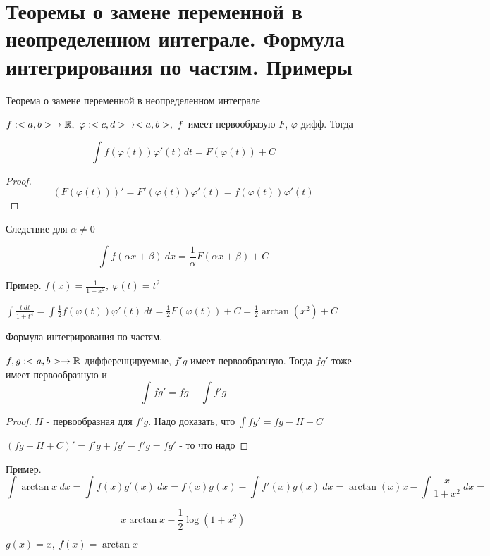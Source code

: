 \section{Теоремы о замене переменной в неопределенном интеграле. Формула интегрирования по частям. Примеры}

\begin{theorem}
    Теорема о замене переменной в неопределенном интеграле

    $f: <a, b> \to \mathbb{R},\ \varphi: <c, d> \to <a, b>,\ f$
    имеет первообразую $F$, $\varphi$ дифф. Тогда

    \[ \int f(\varphi(t))\varphi'(t) dt = F(\varphi(t))+C \]
\end{theorem}

\begin{proof}
    \[(F(\varphi(t)))' = F'(\varphi(t))\varphi'(t) = f(\varphi(t))\varphi'(t)\]
\end{proof}

Следствие для $\alpha \neq 0$

\[\int f(\alpha x + \beta)\ dx = \frac{1}{\alpha} F(\alpha x + \beta) + C \]

Пример. $f(x) = \frac{1}{1+x^2},\ \varphi(t) = t^2$

$\int \frac{t\ dt}{1+t^4} = \int \frac{1}{2}f(\varphi(t))\varphi'(t)\ dt
= \frac{1}{2} F(\varphi(t)) + C = \frac{1}{2} \arctan(x^2) + C$

\begin{theorem}
    Формула интегрирования по частям.

    $f, g: <a, b> \to \mathbb{R}$ дифференцируемые, $f'g$ имеет первообразную. Тогда
    $fg'$ тоже имеет первообразную и 
    \[ \int fg' = fg - \int f'g \]
\end{theorem}

\begin{proof}
    $H$ - первообразная для $f'g$. Надо доказать, что $\int fg' = fg - H + C$
    
    $(fg - H +C)' = f'g+fg'-f'g = fg'$ - то что надо
\end{proof}

Пример. \[\int \arctan x\ dx = \int f(x)g'(x)\ dx =
f(x)g(x)-\int f'(x)g(x)\ dx = \arctan(x)x - \int \frac{x}{1+x^2}\ dx = \]

\[ x\arctan x - \frac{1}{2} \log(1+x^2)\]

$g(x) = x,\ f(x) = \arctan x$